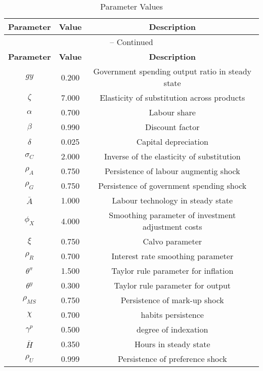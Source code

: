 \begin{center}
\begin{longtable}{ccc}
\caption{Parameter Values}\\%
\toprule%
\multicolumn{1}{c}{\textbf{Parameter}} &
\multicolumn{1}{c}{\textbf{Value}} &
 \multicolumn{1}{c}{\textbf{Description}}\\%
\midrule%
\endfirsthead
\multicolumn{3}{c}{{\tablename} \thetable{} -- Continued}\\%
\midrule%
\multicolumn{1}{c}{\textbf{Parameter}} &
\multicolumn{1}{c}{\textbf{Value}} &
  \multicolumn{1}{c}{\textbf{Description}}\\%
\midrule%
\endhead
${gy}$ 	 & 	 0.200 	 & 	 Government spending output ratio in steady state\\
${\zeta}$ 	 & 	 7.000 	 & 	 Elasticity of substitution across products\\
${\alpha}$ 	 & 	 0.700 	 & 	 Labour share\\
${\beta}$ 	 & 	 0.990 	 & 	 Discount factor\\
${\delta}$ 	 & 	 0.025 	 & 	 Capital depreciation\\
${\sigma_{C}}$ 	 & 	 2.000 	 & 	 Inverse of the elasticity of substitution\\
${\rho_{A}}$ 	 & 	 0.750 	 & 	 Persistence of labour augmentig shock\\
${\rho_{G}}$ 	 & 	 0.750 	 & 	 Persistence of government spending shock\\
${\bar{A}}$ 	 & 	 1.000 	 & 	 Labour technology in steady state\\
${\phi_{X}}$ 	 & 	 4.000 	 & 	 Smoothing parameter of investment adjustment costs\\
${\xi}$ 	 & 	 0.750 	 & 	 Calvo parameter\\
${\rho_{R}}$ 	 & 	 0.700 	 & 	 Interest rate smoothing parameter\\
$\theta^{\pi}$ 	 & 	 1.500 	 & 	 Taylor rule parameter for inflation\\
$\theta^{y}$ 	 & 	 0.300 	 & 	 Taylor rule parameter for output\\
${\rho_{MS}}$ 	 & 	 0.750 	 & 	 Persistence of mark-up shock\\
${\chi}$ 	 & 	 0.700 	 & 	 habits persistence\\
${\gamma^{p}}$ 	 & 	 0.500 	 & 	 degree of indexation\\
${\bar{H}}$ 	 & 	 0.350 	 & 	 Hours in steady state\\
${\rho_{U}}$ 	 & 	 0.999 	 & 	 Persistence of preference shock\\

\end{longtable}
\end{center}
